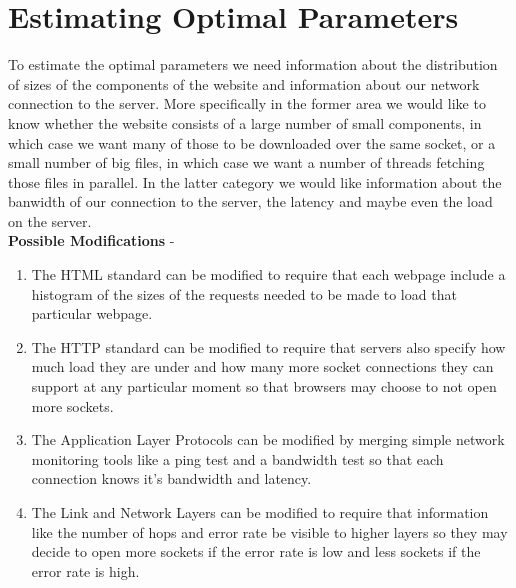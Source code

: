 \documentclass[12pt]{article}
\begin{document}
\section{Estimating Optimal Parameters}
To estimate the optimal parameters we need information about the distribution of sizes of the components of the website and information about our network connection to the server. More specifically in the former area we would like to know whether the website consists of a large number of small components, in which case we want many of those to be downloaded over the same socket, or  a small number of big files, in which case we want a number of threads fetching those files in parallel. In the latter category we would like information about the banwidth of our connection to the server, the latency and maybe even the load on the server.\\
\textbf{Possible Modifications} -
\begin{enumerate}
\item The HTML standard can be modified to require that each webpage include a histogram of the sizes of the requests needed to be made to load that particular webpage.
\item The HTTP standard can be modified to require that servers also specify how much load they are under and how many more socket connections they can support at any particular moment so that browsers may choose to not open more sockets.
\item The Application Layer Protocols can be modified by merging simple network monitoring tools like a ping test and a bandwidth test so that each connection knows it's bandwidth and latency.
\item The Link and Network Layers can be modified to require that information like the number of hops and error rate be visible to higher layers so they may decide to open more sockets if the error rate is low and less sockets if the error rate is high.
\end{enumerate}
\end{document}
